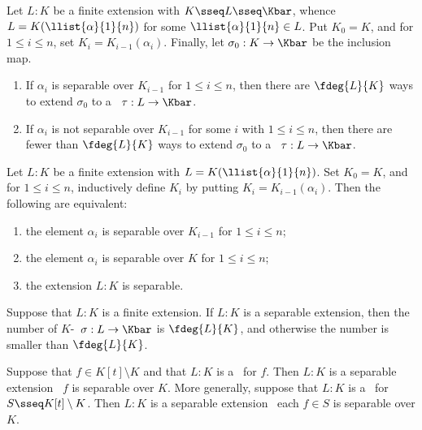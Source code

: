 \documentclass[a4paper]{article}
\begin{document}
\begin{ttheorem}
  Let \( L:K \) be a finite extension with \( K\sseq L\sseq \Kbar \), whence \( L=K(\llist{\alpha}{1}{n}) \) for some \( \llist{\alpha}{1}{n}\in L \).
  Put \( K_0=K \), and for \( 1\leq i\leq n \), set \( K_i=K_{i-1}(\alpha_i) \).
  Finally, let \( \sigma_0:K\to\Kbar \) be the inclusion map. \begin{enumerate}[label=(\roman*)]
    \item If \( \alpha_i \) is separable over \( K_{i-1} \) for \( 1\leq i\leq n \), then there are \( \fdeg{L}{K} \) ways to extend \( \sigma_0 \) to a \homo~\( \tau:L\to \Kbar \).
    \item If \( \alpha_i \) is not separable over \( K_{i-1} \) for some \( i \) with \( 1\leq i\leq n \), then there are fewer than \( \fdeg{L}{K} \) ways to extend \( \sigma_0 \) to a \homo~\( \tau:L\to \Kbar \).
  \end{enumerate}
\end{ttheorem}

\begin{ttheorem}
  Let \( L:K \) be a finite extension with \( L=K(\llist{\alpha}{1}{n}) \).
  Set \( K_0=K \), and for \( 1\leq i\leq n \), inductively define \( K_i \) by putting \( K_i=K_{i-1}(\alpha_i) \).
  Then the following are equivalent: \begin{enumerate}[label=(\roman*)]
    \item the element \( \alpha_i \) is separable over \( K_{i-1} \) for \( 1\leq i\leq n \);
    \item the element \( \alpha_i \) is separable over \( K \) for \( 1\leq i\leq n \);
    \item the extension \( L:K \) is separable.
  \end{enumerate}
\end{ttheorem}

\begin{tcorollary}
  Suppose that \( L:K \) is a finite extension.
  If \( L:K \) is a separable extension, then the number of \( K \)-\homo~\( \sigma:L\to\Kbar \) is \( \fdeg{L}{K} \), and otherwise the number is smaller than \( \fdeg{L}{K} \).
\end{tcorollary}

\begin{tcorollary}
  Suppose that \( f\in K[t]\setminus K \) and that \( L:K \) is a \sfe~for \( f \).
  Then \( L:K \) is a separable extension \iff~\( f \) is separable over \( K \).
  More generally, suppose that \( L:K \) is a \sfe~for \( S\sseq K[t]\setminus K \).
  Then \( L:K \) is a separable extension \iff~each \( f\in S \) is separable over \( K \).
\end{tcorollary}
\end{document}
